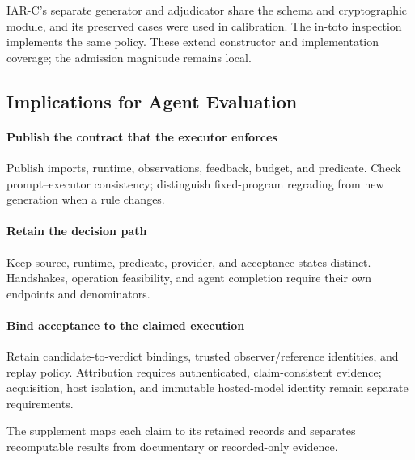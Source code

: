 IAR-C's separate generator and adjudicator share the schema and cryptographic
module, and its preserved cases were used in calibration. The in-toto
inspection implements the same policy. These extend constructor and
implementation coverage; the admission magnitude remains local.

\subsection{Implications for Agent Evaluation}
\paragraph{Publish the contract that the executor enforces}
Publish imports, runtime, observations, feedback, budget, and predicate.
Check prompt--executor consistency; distinguish fixed-program regrading from
new generation when a rule changes.

\paragraph{Retain the decision path}
Keep source, runtime, predicate, provider, and acceptance states distinct.
Handshakes, operation feasibility, and agent completion require their own
endpoints and denominators.

\paragraph{Bind acceptance to the claimed execution}
Retain candidate-to-verdict bindings, trusted observer/reference identities,
and replay policy. Attribution requires authenticated, claim-consistent
evidence; acquisition, host isolation, and immutable hosted-model identity
remain separate requirements.

The supplement maps each claim to its retained records and separates
recomputable results from documentary or recorded-only evidence.
